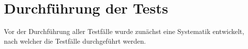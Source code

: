 \section{Durchführung der Tests}
\label{sec:testExecution}

Vor der Durchführung aller Testfälle wurde zunächst eine Systematik entwickelt, nach welcher die Testfälle durchgeführt werden.

